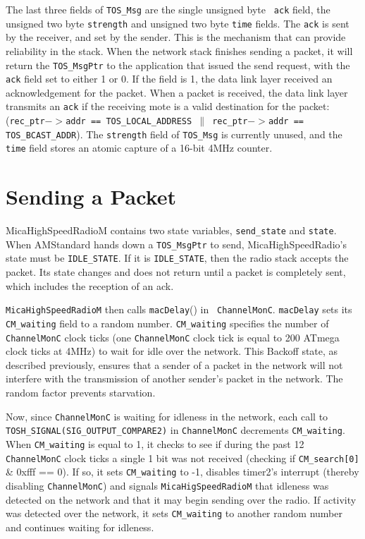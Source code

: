 \documentclass[11pt]{article}
\begin{document}
The last three fields of {\tt TOS\_Msg} are the single unsigned byte {\tt
ack} field, the unsigned two byte {\tt strength} and unsigned two byte {\tt time}
fields.  The {\tt ack} is sent by the receiver, and set by the
sender. This is the mechanism that can provide reliability in the
stack. When the network stack finishes sending a packet, it will
return the {\tt TOS\_MsgPtr} to the application that issued the send
request, with the {\tt ack} field set to either 1 or 0.  If the field
is 1, the data link layer received an acknowledgement for the
packet. When a packet is received, the data link layer transmits an
{\tt ack} if the receiving mote is a valid destination for the packet:
({\tt rec\_ptr$->$addr == TOS\_LOCAL\_ADDRESS $\parallel$ rec\_ptr$->$addr ==
TOS\_BCAST\_ADDR}).  The {\tt strength} field of {\tt TOS\_Msg} is currently
unused, and the {\tt time} field stores an atomic capture of a 16-bit 4MHz
counter. 

\section*{Sending a Packet}
MicaHighSpeedRadioM contains two state variables, {\tt send\_state} and
{\tt state}.  When AMStandard hands down a {\tt TOS\_MsgPtr} to send,
MicaHighSpeedRadio's state must be {\tt IDLE\_STATE}.  If it is {\tt IDLE\_STATE}, then the
radio stack accepts the packet.  Its state changes and does not return 
until a packet is completely sent, which includes the reception of an
ack.

{\tt MicaHighSpeedRadioM} then calls {\tt macDelay}() in {\tt
ChannelMonC}.  {\tt macDelay} sets its {\tt CM\_waiting} field to a
random number.  {\tt CM\_waiting} specifies the number of {\tt
ChannelMonC} clock ticks (one {\tt ChannelMonC} clock tick is equal to
200 ATmega clock ticks at 4MHz) to wait for idle over the network.
This Backoff state, as described previously, ensures that a sender of
a packet in the network will not interfere with the transmission of
another sender's packet in the network. The random factor prevents
starvation.

Now, since {\tt ChannelMonC} is waiting for idleness in the network, each
call to \\
{\tt TOSH\_SIGNAL(SIG\_OUTPUT\_COMPARE2)} in {\tt ChannelMonC} decrements
{\tt CM\_waiting}.  When {\tt CM\_waiting} is equal to 1, it checks to see if 
during the past 12 {\tt ChannelMonC} clock ticks a single 1 bit was not
received (checking if {\tt CM\_search[0]} \& 0xfff == 0).  If so, it sets
{\tt CM\_waiting} to -1, disables timer2's interrupt (thereby disabling
{\tt ChannelMonC}) and signals {\tt MicaHigSpeedRadioM} that idleness was
detected on the network and that it may begin sending over the radio.
If activity was detected over the network, it sets {\tt CM\_waiting} to
another random number and continues waiting for idleness.  
\end{document}
